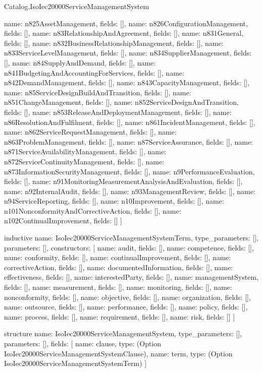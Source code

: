 \begin{lexlean}{Catalog.IsoIec20000ServiceManagementSystem}
\begin{semanticmodule}
{    {name: n825AssetManagement, fields: []},
    {name: n826ConfigurationManagement, fields: []},
    {name: n83RelationshipAndAgreement, fields: []},
    {name: n831General, fields: []},
    {name: n832BusinessRelationshipManagement, fields: []},
    {name: n833ServiceLevelManagement, fields: []},
    {name: n834SupplierManagement, fields: []},
    {name: n84SupplyAndDemand, fields: []},
    {name: n841BudgetingAndAccountingForServices, fields: []},
    {name: n842DemandManagement, fields: []},
    {name: n843CapacityManagement, fields: []},
    {name: n85ServiceDesignBuildAndTransition, fields: []},
    {name: n851ChangeManagement, fields: []},
    {name: n852ServiceDesignAndTransition, fields: []},
    {name: n853ReleaseAndDeploymentManagement, fields: []},
    {name: n86ResolutionAndFulfilment, fields: []},
    {name: n861IncidentManagement, fields: []},
    {name: n862ServiceRequestManagement, fields: []},
    {name: n863ProblemManagement, fields: []},
    {name: n87ServiceAssurance, fields: []},
    {name: n871ServiceAvailabilityManagement, fields: []},
    {name: n872ServiceContinuityManagement, fields: []},
    {name: n873InformationSecurityManagement, fields: []},
    {name: n9PerformanceEvaluation, fields: []},
    {name: n91MonitoringMeasurementAnalysisAndEvaluation, fields: []},
    {name: n92InternalAudit, fields: []},
    {name: n93ManagementReview, fields: []},
    {name: n94ServiceReporting, fields: []},
    {name: n10Improvement, fields: []},
    {name: n101NonconformityAndCorrectiveAction, fields: []},
    {name: n102ContinualImprovement, fields: []}
  ]
}

inductive{
  name: IsoIec20000ServiceManagementSystemTerm,
  type_parameters: [],
  parameters: [],
  constructors: [
    {name: audit, fields: []},
    {name: competence, fields: []},
    {name: conformity, fields: []},
    {name: continualImprovement, fields: []},
    {name: correctiveAction, fields: []},
    {name: documentedInformation, fields: []},
    {name: effectiveness, fields: []},
    {name: interestedParty, fields: []},
    {name: managementSystem, fields: []},
    {name: measurement, fields: []},
    {name: monitoring, fields: []},
    {name: nonconformity, fields: []},
    {name: objective, fields: []},
    {name: organization, fields: []},
    {name: outsource, fields: []},
    {name: performance, fields: []},
    {name: policy, fields: []},
    {name: process, fields: []},
    {name: requirement, fields: []},
    {name: risk, fields: []}
  ]
}

structure{
  name: IsoIec20000ServiceManagementSystem,
  type_parameters: [],
  parameters: [],
  fields: [
    {name: clause, type: (Option IsoIec20000ServiceManagementSystemClause)},
    {name: term, type: (Option IsoIec20000ServiceManagementSystemTerm)}
  ]
}
\end{semanticmodule}
\end{lexlean}
